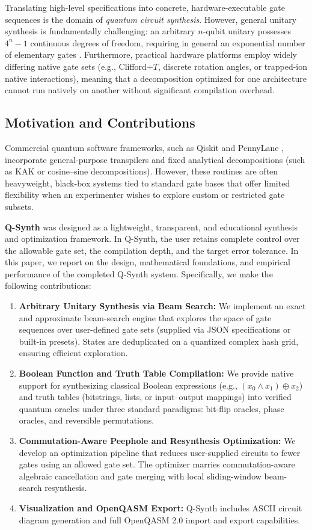 \documentclass[11pt]{article}
\begin{document}
Translating high-level specifications into concrete, hardware-executable gate sequences is the domain of \emph{quantum circuit synthesis}. However, general unitary synthesis is fundamentally challenging: an arbitrary $n$-qubit unitary possesses $4^n - 1$ continuous degrees of freedom, requiring in general an exponential number of elementary gates \cite{shende2006}. Furthermore, practical hardware platforms employ widely differing native gate sets (e.g., Clifford$+T$, discrete rotation angles, or trapped-ion native interactions), meaning that a decomposition optimized for one architecture cannot run natively on another without significant compilation overhead.

\subsection{Motivation and Contributions}
Commercial quantum software frameworks, such as Qiskit and PennyLane \cite{bergholm2018}, incorporate general-purpose transpilers and fixed analytical decompositions (such as KAK or cosine--sine decompositions). However, these routines are often heavyweight, black-box systems tied to standard gate bases that offer limited flexibility when an experimenter wishes to explore custom or restricted gate subsets.

\textbf{Q-Synth} was designed as a lightweight, transparent, and educational synthesis and optimization framework. In Q-Synth, the user retains complete control over the allowable gate set, the compilation depth, and the target error tolerance. In this paper, we report on the design, mathematical foundations, and empirical performance of the completed Q-Synth system. Specifically, we make the following contributions:
\begin{enumerate}[label=\textbf{\arabic*.}]
    \item \textbf{Arbitrary Unitary Synthesis via Beam Search:} We implement an exact and approximate beam-search engine that explores the space of gate sequences over user-defined gate sets (supplied via JSON specifications or built-in presets). States are deduplicated on a quantized complex hash grid, ensuring efficient exploration.
    \item \textbf{Boolean Function and Truth Table Compilation:} We provide native support for synthesizing classical Boolean expressions (e.g., $(x_0 \land x_1) \oplus x_2$) and truth tables (bitstrings, lists, or input--output mappings) into verified quantum oracles under three standard paradigms: bit-flip oracles, phase oracles, and reversible permutations.
    \item \textbf{Commutation-Aware Peephole and Resynthesis Optimization:} We develop an optimization pipeline that reduces user-supplied circuits to fewer gates using an allowed gate set. The optimizer marries commutation-aware algebraic cancellation and gate merging with local sliding-window beam-search resynthesis.
    \item \textbf{Visualization and OpenQASM Export:} Q-Synth includes ASCII circuit diagram generation and full OpenQASM 2.0 import and export capabilities.
\end{enumerate}
\end{document}
